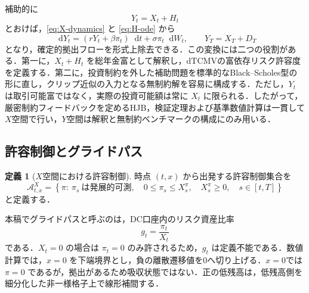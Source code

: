 \documentclass[10pt,a4paper]{article}
\theoremstyle{plain}
\theoremstyle{definition}
\newtheorem{definition}{定義}
\newcommand{\A}{\mathcal{A}}
\newcommand{\dd}{\mathop{}\!\mathrm{d}}
\begin{document}
補助的に
\begin{equation}
  Y_t=X_t+H_t
  \label{eq:Y-def}
\end{equation}
とおけば，\eqref{eq:X-dynamics} と \eqref{eq:H-ode} から
\begin{equation}
  \dd Y_t=(rY_t+\beta\pi_t)\dd t+\sigma\pi_t\dd W_t,
  \qquad Y_T=X_T+D_T
  \label{eq:Y-dynamics}
\end{equation}
となり，確定的拠出フローを形式上除去できる．この変換には二つの役割がある．第一に，$X_t+H_t$ を総年金富として解釈し，dTCMVの富依存リスク許容度を定義する．第二に，投資制約を外した補助問題を標準的なBlack--Scholes型の形に直し，クリップ近似の入力となる無制約解を容易に構成する．ただし，$Y_t$ は取引可能富ではなく，実際の投資可能額は常に $X_t$ に限られる．したがって，厳密制約フィードバックを定めるHJB，検証定理および基準数値計算は一貫して $X$空間で行い，$Y$空間は解釈と無制約ベンチマークの構成にのみ用いる．

\subsection{許容制御とグライドパス}
\label{sec:admissible-glide}

\begin{definition}[$X$空間における許容制御]
時点 $(t,x)$ から出発する許容制御集合を
\begin{equation}
  \A^X_{t,x}
  =
  \left\{
  \pi:\ \pi_s\ \text{は発展的可測},\quad
  0\leq\pi_s\leq X_s^\pi,\quad X_s^\pi\geq0,\quad s\in[t,T]
  \right\}
  \label{eq:admissible-X}
\end{equation}
と定義する．
\end{definition}

本稿でグライドパスと呼ぶのは，DC口座内のリスク資産比率
\begin{equation}
  g_t=\frac{\pi_t}{X_t}
  \label{eq:glidepath-def}
\end{equation}
である．$X_t=0$ の場合は $\pi_t=0$ のみ許されるため，$g_t$ は定義不能である．数値計算では，$x=0$ を下端境界とし，負の離散遷移値を0へ切り上げる．$x=0$では $\pi=0$ であるが，拠出があるため吸収状態ではない．正の低残高は，低残高側を細分化した非一様格子上で線形補間する．
\end{document}
